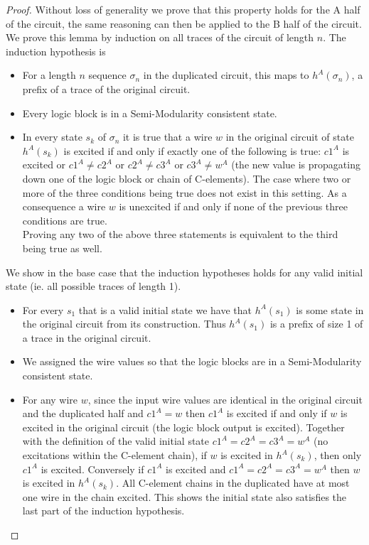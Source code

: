 \documentclass[12pt]{report}
\begin{document}
\begin{proof}
Without loss of generality we prove that this property holds for the A half of the circuit, the same reasoning can then be applied to the B half of the circuit.  We prove this lemma by induction on all traces of the circuit of length $n$.  The induction hypothesis is
\begin{itemize}
\item For a length $n$ sequence $\sigma_n$ in the duplicated circuit, this maps to $h^{A}(\sigma_n)$, a prefix of a trace of the original circuit.
\item Every logic block is in a Semi-Modularity consistent state.  %
\item In every state $s_k$ of $\sigma_n$ it is true that a wire $w$ in the original circuit of state $h^A(s_k)$ is excited if and only if exactly one of the following is true: $c1^A$ is excited or $c1^{A}\neq c2^{A}$ or $c2^{A}\neq c3^A$ or $c3^{A}\neq w^A$ (the new value is propagating down one of the logic block or chain of C-elements).  The case where two or more of the three conditions being true does not exist in this setting.  As a consequence a wire $w$ is unexcited if and only if none of the previous three conditions are true. \\
Proving any two of the above three statements is equivalent to the third being true as well.%
\end{itemize}
We show in the base case that the induction hypotheses holds for any valid initial state (ie. all possible traces of length 1). 
\begin{itemize}
\item For every $s_1$ that is a valid initial state we have that $h^A(s_1)$ is some state in the original circuit from its construction.  Thus $h^A(s_1)$ is a prefix of size 1 of a trace in the original circuit.  
\item We assigned the wire values so that the logic blocks are in a Semi-Modularity consistent state.  
\item For any wire $w$, since the input wire values are identical in the original circuit and the duplicated half and $c1^A=w$ then $c1^A$ is excited if and only if $w$ is excited in the original circuit (the logic block output is excited).  Together with the definition of the valid initial state $c1^A=c2^A=c3^A=w^A$ (no excitations within the C-element chain), if $w$ is excited in $h^A(s_k)$, then only $c1^A$ is excited.  Conversely if $c1^A$ is excited and $c1^A=c2^A=c3^A=w^A$ then $w$ is excited in $h^A(s_k)$.  All C-element chains in the duplicated have at most one wire in the chain excited. This shows the initial state also satisfies the last part of the induction hypothesis.    %
\end{itemize}


\end{proof}
\end{document}
